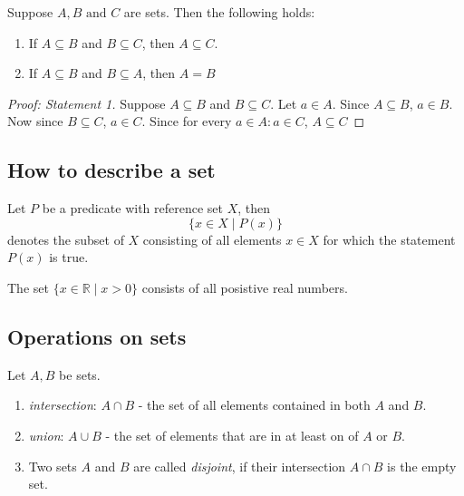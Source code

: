 \begin{proposition}
    Suppose $ A,B\text{ and } C $ are sets. Then the following holds:
    \begin{enumerate}
        \item If $ A \subseteq B $ and $ B \subseteq C $, then $ A \subseteq C $.
        \item If $ A \subseteq B $ and $ B \subseteq A $, then $ A = B $
    \end{enumerate}
\end{proposition}
\begin{proof}[Proof: Statement 1]
    Suppose $ A \subseteq B $ and $ B \subseteq C $. Let $ a \in A $. Since $ A \subseteq B $, $ a \in B $. Now since $ B \subseteq C $, $ a \in C $.
    Since for every $ a \in A : a \in C $, $ A \subseteq C $
\end{proof}

\subsection{How to describe a set}
\begin{definition}
    Let $ P $ be a predicate with reference set $ X $, then $$ \{x \in X \mid P(x)\} $$
    denotes the subset of $ X $ consisting of all elements $ x \in X $ for which the statement $ P(x) $ is true.
\end{definition}
\begin{example}
    The set $ \{x \in \mathbb{R} \mid x > 0\} $ consists of all posistive real numbers.
\end{example}

\subsection{Operations on sets}
\begin{definition}
    Let $A, B$ be sets.
    \begin{enumerate}
        \item \emph{intersection}: $ A \cap B $ - the set of all elements contained in both $A$ and $B$.
        \item \emph{union}: $ A \cup B $ - the set of elements that are in at least on of $A$ or $B$.
        \item Two sets $A$ and $B$ are called \emph{disjoint}, if their intersection $ A \cap B $ is the empty set.
    \end{enumerate}
\end{definition}

